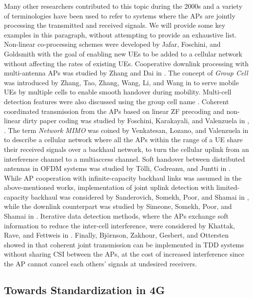 Many other researchers contributed to this topic during the 2000s and a variety of terminologies have been used to refer to systems where the \glspl{AP} are jointly processing the transmitted and received signals. We will provide some key examples in this paragraph, without attempting to provide an exhaustive list. 
Non-linear co-processing schemes were developed by Jafar, Foschini, and Goldsmith  \cite{Jafar2004a} with the goal of enabling new \glspl{UE} to be added to a cellular network without affecting the rates of existing \glspl{UE}.
Cooperative downlink processing with multi-antenna \glspl{AP} was studied by Zhang and Dai in \cite{Zhang2004a}. 
The concept of \emph{Group Cell} was introduced by Zhang, Tao, Zhang, Wang, Li, and Wang in \cite{Zhang2005b} to serve mobile UEs by multiple cells to enable smooth handover during mobility. Multi-cell detection features were also discussed using the group cell name \cite{Tao2005a}.
Coherent coordinated transmission from the \glspl{AP} based on linear \gls{ZF} precoding and non-linear dirty paper coding was studied by Foschini, Karakayali, and Valenzuela in \cite{Foschini2006a}, \cite{Karakayali2006a}.
The term \emph{Network MIMO} was coined by Venkatesan, Lozano, and Valenzuela in \cite{Venkatesan2007a} to describe a cellular network where all the \glspl{AP} within the range of a \gls{UE} share their received signals over a backhaul network, to turn the cellular uplink from an interference channel to a multiaccess channel.
Soft handover between distributed antennas in \gls{OFDM} systems was studied by T\"olli, Codreanu, and Juntti in \cite{Tolli2008a}. While \gls{AP} cooperation with infinite-capacity backhaul links was assumed in the above-mentioned works, implementation of joint uplink detection with limited-capacity backhaul was considered by Sanderovich, Somekh, Poor, and Shamai in \cite{Sanderovich2009a}, while the downlink counterpart was studied by Simeone, Somekh, Poor, and Shamai in \cite{Simeone2009a}. 
Iterative data detection methods, where the \glspl{AP} exchange soft information to reduce the inter-cell interference, were considered by Khattak, Rave, and Fettweis in \cite{Khattak2008a}.
Finally, Bj\"ornson, Zakhour, Gesbert, and Ottersten showed in \cite{Bjornson2010c} that coherent joint transmission can be implemented in \gls{TDD} systems without sharing \gls{CSI} between the \glspl{AP}, at the cost of increased interference since the \gls{AP} cannot cancel each others' signals at undesired receivers.


\subsection{Towards Standardization in 4G}

